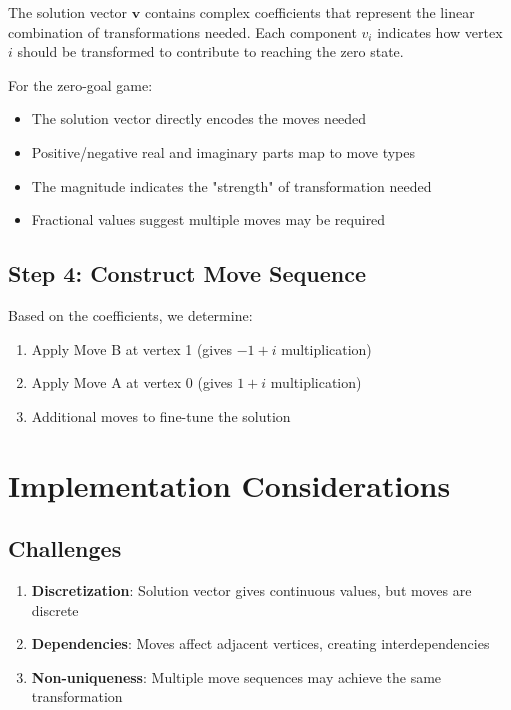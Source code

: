 \documentclass{article}
\begin{document}
The solution vector $\mathbf{v}$ contains complex coefficients that represent the linear combination of transformations needed. Each component $v_i$ indicates how vertex $i$ should be transformed to contribute to reaching the zero state.

For the zero-goal game:
\begin{itemize}
    \item The solution vector directly encodes the moves needed
    \item Positive/negative real and imaginary parts map to move types
    \item The magnitude indicates the "strength" of transformation needed
    \item Fractional values suggest multiple moves may be required
\end{itemize}

\subsection{Step 4: Construct Move Sequence}

Based on the coefficients, we determine:
\begin{enumerate}
    \item Apply Move B at vertex 1 (gives $-1+i$ multiplication)
    \item Apply Move A at vertex 0 (gives $1+i$ multiplication)
    \item Additional moves to fine-tune the solution
\end{enumerate}

\section{Implementation Considerations}

\subsection{Challenges}

\begin{enumerate}
    \item \textbf{Discretization}: Solution vector gives continuous values, but moves are discrete
    \item \textbf{Dependencies}: Moves affect adjacent vertices, creating interdependencies
    \item \textbf{Non-uniqueness}: Multiple move sequences may achieve the same transformation
\end{enumerate}
\end{document}
